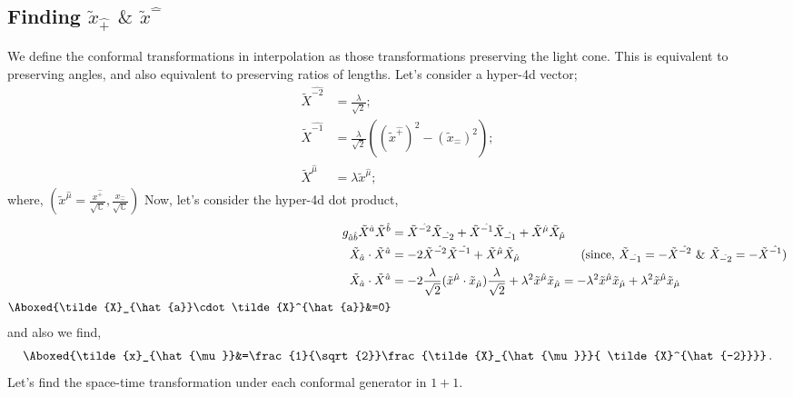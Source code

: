 \documentclass[]{article}
\numberwithin{equation}{section}
\begin{document}
{{\subsection{Finding $\tilde{x}_{\hat{+}}$ $\&$ $\tilde{x}^{\hat{-}}$}
We define the conformal transformations in interpolation as those transformations preserving the light cone. This is equivalent to preserving angles, and also equivalent to preserving ratios of lengths. Let's consider a hyper-4d vector;
\begin{align}
    \tilde{X}^{\hat{-2}}&=\frac{\lambda}{\sqrt{2}};\\
    \tilde{X}^{\hat{-1}}&=\frac{\lambda}{\sqrt{2}}((\tilde{x}^{\hat{+}})^{2}-(\tilde{x}_{\hat{-}})^2);\\
     \tilde{X}^{\hat{\mu}}&=\lambda \tilde{x}^{\hat{\mu}};
\end{align}
where, $\left(\tilde{x}^{\hat{\mu}}=\frac{x^{\hat{+}}}{\sqrt{\mathbb{C}}}, \frac{x_{\hat{-}}}{\sqrt{\mathbb{C}}}\right)$ Now, let's consider the hyper-4d dot product,
\begin{align}
    g_{\hat{a}\hat{b}}\tilde{X}^{\hat{a}} \tilde{X}^{\hat{b}}&=\tilde{X}^{\hat{-2}}\tilde{X}_{\hat{-2}}+\tilde{X}^{\hat{-1}}\tilde{X}_{\hat{-1}}+\tilde{X}^{\hat{\mu}}\tilde{X}_{\hat{\mu}}\\
    \tilde{X}_{\hat{a}}\cdot\tilde{X}^{\hat{a}}&=-2\tilde{X}^{\hat{-2}}\tilde{X}^{\hat{-1}}+\tilde{X}^{\hat{\mu}}\tilde{X}_{\hat{\mu}}~~~~~~~~~~~~~~~(\text{since, }\tilde{X}_{\hat{-1}}=-\tilde{X}^{\hat{-2}}~\&~\tilde{X}_{\hat{-2}}=-\tilde{X}^{\hat{-1}})\\
     \tilde{X}_{\hat{a}}\cdot\tilde{X}^{\hat{a}}&=-2\frac{\lambda}{\sqrt{2}}(\tilde{x}^{\hat{\mu}}\cdot\tilde{x}_{\hat{\mu}})\frac{\lambda}{\sqrt{2}}+\lambda^2\tilde{x}^{\hat{\mu}}\tilde{x}_{\hat{\mu}}=-\lambda^2\tilde{x}^{\hat{\mu}}\tilde{x}_{\hat{\mu}}+\lambda^2\tilde{x}^{\hat{\mu}}\tilde{x}_{\hat{\mu}}\\
      \Aboxed{\tilde{X}_{\hat{a}}\cdot\tilde{X}^{\hat{a}}&=0}
\end{align}
and also we find,
\begin{align}
     \Aboxed{\tilde{x}_{\hat{\mu}}&=\frac{1}{\sqrt{2}}\frac{\tilde{X}_{\hat{\mu}}}{ \tilde{X}^{\hat{-2}}}}\,.
\end{align}
Let's find the space-time transformation under each conformal generator in $1+1$.
}}
\end{document}
